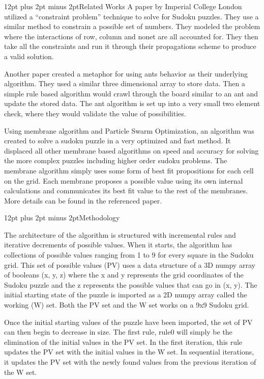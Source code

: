 \documentclass[twocolumn]{article}
\makeatletter
\def\section{\@startsection {section}{1}{\z@}{24pt plus 2pt minus 2pt}
{12pt plus 2pt minus 2pt}{\large\bf}}
\makeatother
\begin{document}
\section{Related Works}
A paper by Imperial College London\cite{constraint} utilized a “constraint problem” technique to solve for Sudoku puzzles. They use a similar method to constrain a possible set of numbers. They modeled the problem where the interactions of row, column and nonet are all accounted for. They then take all the constraints and run it through their propagations scheme to produce a valid solution.

Another paper created a metaphor for using ants behavior as their underlying algorithm\cite{ant}. They used a similar three dimensional array to store data. Then a simple rule based algorithm would crawl through the board similar to an ant and update the stored data. The ant algorithm is set up into a very small two element check, where they would validate the value of possibilities.
 
Using membrane algorithm and Particle Swarm Optimization, an algorithm was created to solve a sudoku puzzle in a very optimized and fast method. It displaced all other membrane based algorithms on speed and accuracy for solving the more complex puzzles including higher order sudoku problems. The membrane algorithm simply uses some form of best fit propositions for each cell on the grid. Each membrane proposes a possible value using its own internal calculations and communicates its best fit value to the rest of the membranes. More details can be found in the referenced paper\cite{membrane}.


\section{Methodology}

The architecture of the algorithm is structured with incremental rules and iterative decrements of possible values. When it starts, the algorithm has collections of possible values ranging from 1 to 9 for every square in the Sudoku grid. This set of possible values (PV) uses a data structure of a 3D numpy array of booleans (x, y, z) where the x and y represents the grid coordinates of the Sudoku puzzle and the z represents the possible values that can go in (x, y). The initial starting state of the puzzle is imported as a 2D numpy array called the working (W) set. Both the PV set and the W set works on a 9x9 Sudoku grid.

Once the initial starting values of the puzzle have been imported, the set of PV can then begin to decrease in size. The first rule, rule0 will simply be the elimination of the initial values in the PV set. In the first iteration, this rule updates the PV set with the initial values in the W set. In sequential iterations, it updates the PV set with the newly found values from the previous iteration of the W set.
\end{document}
